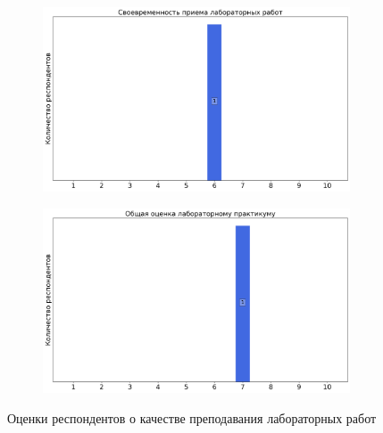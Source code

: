 \begin{figure}[H]
\begin{subfigure}[b]{0.45\textwidth}
				\includegraphics[width=\textwidth]{images/2 course/Общая физика - электричество и магнетизм/labniks-marks-Меньших Н.Л.-2.png}
			\end{subfigure}
			\begin{subfigure}[b]{0.45\textwidth}
				\centering
				\includegraphics[width=\textwidth]{images/2 course/Общая физика - электричество и магнетизм/labniks-marks-Меньших Н.Л.-3.png}
			\end{subfigure}	
			\caption{Оценки респондентов о качестве преподавания лабораторных работ}
		\end{figure}


